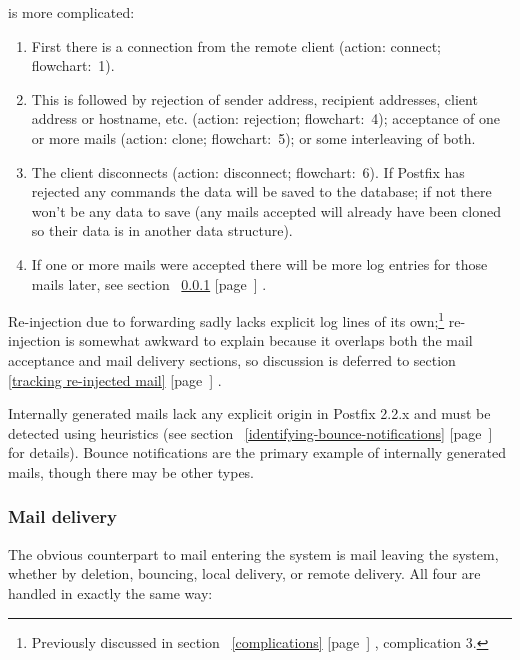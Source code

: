 \documentclass[a4paper,12pt,draft]{article}
\newcommand{\refwithpage}[1]{%
    \empty{}\ref{#1} [page~\pageref{#1}]%
}
\begin{document}
\SMTP{} is more complicated:

\begin{enumerate}

    \item First there is a connection from the remote client (action:
        connect; flowchart:~1).

    \item This is followed by rejection of sender address, recipient
        addresses, client \IP{} address or hostname, etc. (action:
        rejection; flowchart:~4); acceptance of one or more mails (action:
        clone; flowchart:~5); or some interleaving of both.

    \item The client disconnects (action: disconnect; flowchart:~6).  If
        Postfix has rejected any \SMTP{} commands the data will be saved to
        the database; if not there won't be any data to save (any mails
        accepted will already have been cloned so their data is in another
        data structure).

    \item If one or more mails were accepted there will be more log entries
        for those mails later, see section~\refwithpage{mail-delivery}.

\end{enumerate}

Re-injection due to forwarding sadly lacks explicit log lines of its
own;\footnote{Previously discussed in section~\refwithpage{complications},
complication 3.} re-injection is somewhat awkward to explain because it
overlaps both the mail acceptance and mail delivery sections, so discussion
is deferred to section~\refwithpage{tracking re-injected mail}.

Internally generated mails lack any explicit origin in Postfix 2.2.x and
must be detected using heuristics (see
section~\refwithpage{identifying-bounce-notifications} for details).
Bounce notifications are the primary example of internally generated mails,
though there may be other types.

\subsubsection{Mail delivery}

\label{mail-delivery}

The obvious counterpart to mail entering the system is mail leaving the
system, whether by deletion, bouncing, local delivery, or remote delivery.
All four are handled in exactly the same way:
\end{document}
